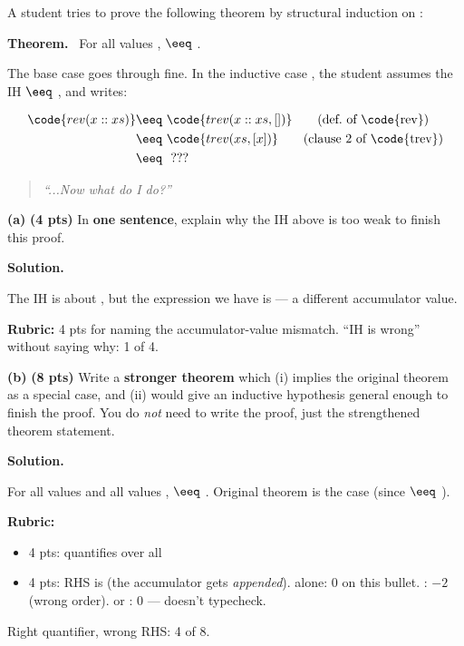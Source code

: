 \documentclass[crop=false]{standalone}
\newif\ifsol
\newenvironment{solution}
    {\par\color{solution_color}\begin{framed}\textbf{Solution.}\par}
    {\end{framed}}
\newcommand{\thmBox}[2]{\par\noindent\begin{mdframed}[backgroundcolor=blue!8,hidealllines=true]\textbf{Theorem#1.} #2\end{mdframed}}
\newcommand{\subpts}[1]{\textbf{(#1 pts)}}
\newcommand{\answerspace}[1]{\ifsol\else\vspace{#1}\par\fi}
\begin{document}
A student tries to prove the following theorem by structural induction
on :

\thmBox{}{\, For all values ,
 $\eeq$ \code{rev' L}.}

The base case goes through fine. In the inductive case ,
the student assumes the IH  $\eeq$ , and
writes:

\begin{align*}
  \code{rev (x::xs)} \eeq\ &\code{trev (x::xs, [])}      \tag{def.\ of \code{rev}} \\
                    \eeq\ &\code{trev (xs, [x])}        \tag{clause 2 of \code{trev}} \\
                    \eeq\ &\ ???
\end{align*}

\begin{quote}
\emph{``...Now what do I do?''}
\end{quote}

\vspace{0.3em}

\textbf{(a)} \subpts{4} In \textbf{one sentence}, explain why the IH
above is too weak to finish this proof.

\answerspace{3cm}

\begin{solution}
The IH is about , but the expression we have is
 --- a different accumulator value.

\textbf{Rubric:} 4 pts for naming the accumulator-value mismatch.
``IH is wrong'' without saying why: 1 of 4.
\end{solution}

\vspace{0.3em}

\textbf{(b)} \subpts{8} Write a \textbf{stronger theorem} which (i)
implies the original theorem as a special case, and (ii) would give an
inductive hypothesis general enough to finish the proof. You do
\emph{not} need to write the proof, just the strengthened theorem
statement.

\answerspace{4cm}

\begin{solution}
For all values  and all values ,
 $\eeq$ .
Original theorem is the  case (since 
$\eeq$ ).

\textbf{Rubric:}
\begin{itemize}
  \item 4 pts: quantifies over all 
  \item 4 pts: RHS is  (the accumulator gets
    \emph{appended}).  alone: 0 on this bullet.
    : $-2$ (wrong order).  or
    : 0 --- doesn't typecheck.
\end{itemize}
Right quantifier, wrong RHS: 4 of 8.
\end{solution}
\end{document}
